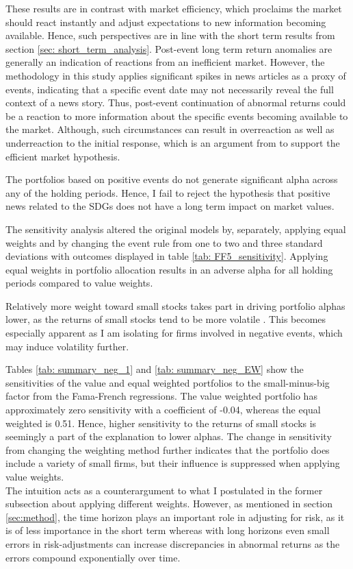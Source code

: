 These results are in contrast with market efficiency, which proclaims the market should react instantly and adjust expectations to new information becoming available. Hence, such perspectives are in line with the short term results from section \ref{sec: short_term_analysis}. Post-event long term return anomalies are generally an indication of reactions from an inefficient market. However, the methodology in this study applies significant spikes in news articles as a proxy of events, indicating that a specific event date may not necessarily reveal the full context of a news story. Thus, post-event continuation of abnormal returns could be a reaction to more information about the specific events becoming available to the market. Although, such circumstances can result in overreaction as well as underreaction to the initial response, which is an argument from \cite{fama1998_events} to support the efficient market hypothesis.   

The portfolios based on positive events do not generate significant alpha across any of the holding periods. Hence, I fail to reject the hypothesis that positive news related to the SDGs does not have a long term impact on market values. 

The sensitivity analysis altered the original models by, separately, applying equal weights and by changing the event rule from one to two and three standard deviations with outcomes displayed in table \ref{tab: FF5_sensitivity}. Applying equal weights in portfolio allocation results in an adverse alpha for all holding periods compared to value weights.

Relatively more weight toward small stocks takes part in driving portfolio alphas lower, as the returns of small stocks tend to be more volatile \citep{Fama_french_3fac}. This becomes especially apparent as I am isolating for firms involved in negative events, which may induce volatility further. 

Tables \ref{tab: summary_neg_1} and \ref{tab: summary_neg_EW} show the sensitivities of the value and equal weighted portfolios to the small-minus-big factor from the Fama-French regressions. The value weighted portfolio has approximately zero sensitivity with a coefficient of -0.04, whereas the equal weighted is 0.51. Hence, higher sensitivity to the returns of small stocks is seemingly a part of the explanation to lower alphas. The change in sensitivity from changing the weighting method further indicates that the portfolio does include a variety of small firms, but their influence is suppressed when applying value weights. \\ 
The intuition acts as a counterargument to what I postulated in the former subsection about applying different weights. However, as mentioned in section \ref{sec:method}, the time horizon plays an important role in adjusting for risk, as it is of less importance in the short term whereas  with long horizons even small errors in risk-adjustments can increase discrepancies in abnormal returns as the errors compound exponentially over time. \\

